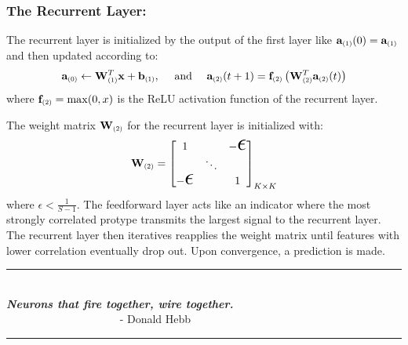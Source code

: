 \subsubsection{The Recurrent Layer:} The recurrent layer is initialized by the output of the first layer like \( \mathbf{a}_{\scaleto{(1)}{6pt}}(0)= \mathbf{a}_{\scaleto{(1)}{6pt}}\) and then updated according to:
    \begin{equation*}
        \mathbf{a}_{\scaleto{(0)}{6pt}}\gets \mathbf{W}^T_{\scaleto{(1)}{6pt}}\mathbf{x}+\mathbf{b}_{\scaleto{(1)}{6pt}},\quad\text{ and }\quad
        \mathbf{a}_{\scaleto{(2)}{6pt}}(t+1)=\mathbf{f}_{\scaleto{(2)}{6pt}}
    \left(
        \mathbf{W}^T_{\scaleto{(2)}{6pt}}\mathbf{a}_{\scaleto{(2)}{6pt}}(t)
    \right)
    \end{equation*}
where \(\mathbf{f}_{\scaleto{(2)}{6pt}}=\max(0,x)\) is the ReLU activation function of the recurrent layer. 

The weight matrix \(\mathbf{W}_{\scaleto{(2)}{6pt}}\) for the recurrent layer is initialized with:
\[
    \mathbf{W}_{\scaleto{(2)}{6pt}}=
        \begin{bmatrix}
            1 &&  -{\scaleto{\epsilon}{9pt}}\\
            &\ddots&\\
            -{\scaleto{\epsilon}{9pt}}&&1
        \end{bmatrix}_{K\times K}
\]
where \(\epsilon < \frac{1}{S-1}\). The feedforward layer acts like an indicator where the most strongly correlated protype transmits the largest signal to the recurrent layer. The recurrent layer then iteratives reapplies the weight matrix until features with lower correlation eventually drop out. Upon convergence, a prediction is made.\\
\begin{center}
\noindent\color{mypink}\rule{4cm}{0.4pt}\\
\emph{\textbf{Neurons that fire together, wire together.}} \\
\(\quad \quad \quad \quad \quad \quad \quad \quad\quad \quad\) - Donald Hebb\\
\noindent\color{mypink}\rule{3cm}{0.4pt}\\
\end{center}
